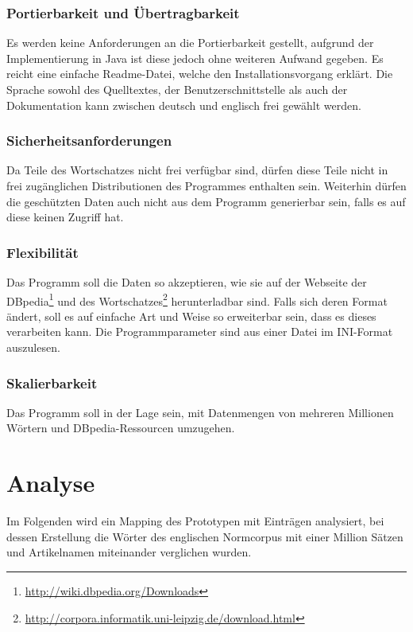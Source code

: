 \subsubsection{Portierbarkeit und Übertragbarkeit}
Es werden keine Anforderungen an die Portierbarkeit gestellt, aufgrund der Implementierung in Java ist diese jedoch ohne weiteren Aufwand gegeben.
Es reicht eine einfache Readme-Datei, welche den Installationsvorgang erklärt.
Die Sprache sowohl des Quelltextes, der Benutzerschnittstelle als auch der Dokumentation kann zwischen deutsch und englisch frei gewählt werden.

\subsubsection{Sicherheitsanforderungen}
Da Teile des Wortschatzes nicht frei verfügbar sind, dürfen diese Teile nicht in frei zugänglichen Distributionen des Programmes enthalten sein.
Weiterhin dürfen die geschützten Daten auch nicht aus dem Programm generierbar sein, falls es auf diese keinen Zugriff hat.

\subsubsection{Flexibilität}
Das Programm soll die Daten so akzeptieren, wie sie auf der Webseite der DBpedia\footnote{\url{http://wiki.dbpedia.org/Downloads}} und des Wortschatzes\footnote{\url{http://corpora.informatik.uni-leipzig.de/download.html}} herunterladbar sind.
Falls sich deren Format ändert, soll es auf einfache Art und Weise so erweiterbar sein, dass es dieses verarbeiten kann.
Die Programmparameter sind aus einer Datei im INI-Format auszulesen.

\subsubsection{Skalierbarkeit}
Das Programm soll in der Lage sein, mit Datenmengen von mehreren Millionen Wörtern und DBpedia-Ressourcen umzugehen.

\section{Analyse}\label{sec:analyse}
Im Folgenden wird ein Mapping des Prototypen mit  Einträgen analysiert, bei dessen Erstellung die  Wörter des englischen Normcorpus mit einer Million Sätzen und  Artikelnamen miteinander verglichen wurden.

